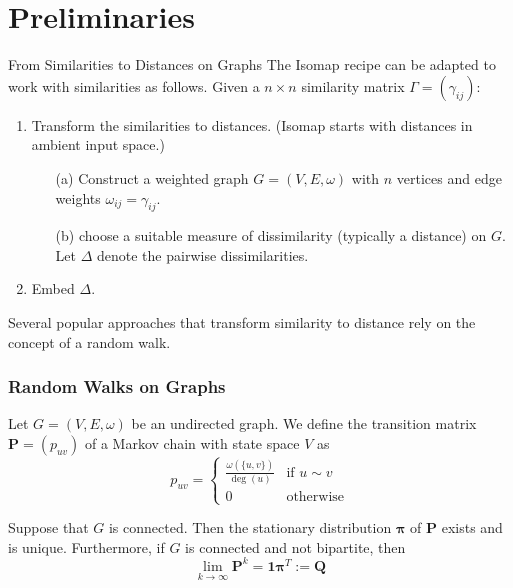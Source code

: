 \documentclass[professionalfonts, hyperref={pdfpagelabels=false,
  colorlinks=true, linkcolor=purple}]{beamer}
\begin{document}
\section{Preliminaries}


\begin{frame}{From Similarities to Distances on Graphs}
 The Isomap recipe can be adapted to work with similarities as
  follows.
  \vskip10pt Given a $n \times n$ similarity matrix $\Gamma = (\gamma_{ij})$:
  \vskip5pt
  \begin{enumerate}
  \item Transform the similarities to distances. (Isomap
    starts with distances in ambient input space.)
    \begin{enumerate}
    \item[(a)]Construct a weighted graph $G = (V,E,\omega)$ with $n$
      vertices and edge weights $\omega_{ij} = \gamma_{ij}$.
    \item[(b)] choose a suitable measure of dissimilarity (typically a
      distance) on $G$. Let $\Delta$ denote the pairwise
      dissimilarities.
    \end{enumerate}
  \item Embed $\Delta$. 
  \end{enumerate}
  \vskip5pt
  Several popular approaches that transform similarity to
   distance rely on the concept of a \alert{random walk}.
\end{frame}

\begin{frame}
  \frametitle{Random Walks on Graphs}
  Let $G = (V,E,\omega)$ be an undirected graph. We define the transition matrix
  $\bm{P} = (p_{uv})$ of a Markov chain with state space $V$ as
  \begin{equation}
    \label{eq:1}
    p_{uv} = \begin{cases}
      \tfrac{\omega(\{u,v\})}{\deg(u)} & \text{if $u \sim v$} \\
      0 & \text{otherwise}
    \end{cases}
  \end{equation}
  
  \vskip10pt Suppose that $G$ is connected. Then the stationary
  distribution $\bm{\pi}$ of $\mathbf{P}$ exists and is
  unique. Furthermore, if $G$ is connected and not bipartite, then 
  \begin{equation}
    \label{eq:2}
 \lim_{k \rightarrow \infty} \mathbf{P}^{k} = \bm{1}\bm{\pi}^{T} :=
  \mathbf{Q}
  \end{equation}
\end{frame}
\end{document}
